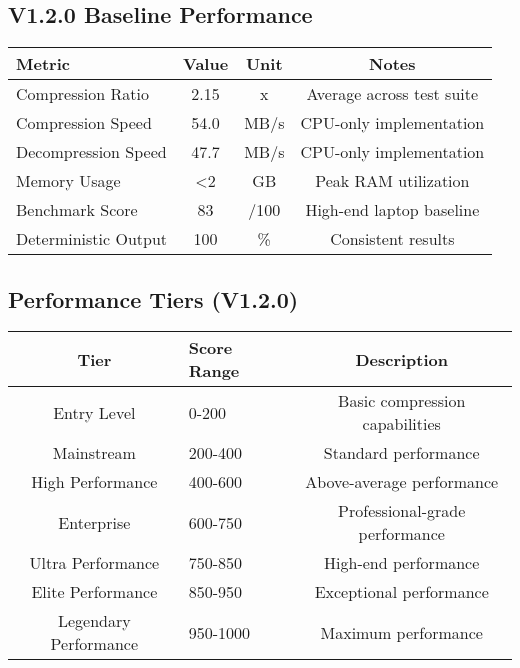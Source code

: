 \documentclass[12pt,a4paper]{article}
\begin{document}
\subsection{V1.2.0 Baseline Performance}
\begin{center}
\begin{tabular}{|l|c|c|c|}
\hline
\textbf{Metric} & \textbf{Value} & \textbf{Unit} & \textbf{Notes} \\
\hline
Compression Ratio & 2.15 & x & Average across test suite \\
Compression Speed & 54.0 & MB/s & CPU-only implementation \\
Decompression Speed & 47.7 & MB/s & CPU-only implementation \\
Memory Usage & <2 & GB & Peak RAM utilization \\
Benchmark Score & 83 & /100 & High-end laptop baseline \\
Deterministic Output & 100 & \% & Consistent results \\
\hline
\end{tabular}
\end{center}

\subsection{Performance Tiers (V1.2.0)}
\begin{center}
\begin{tabular}{|c|l|c|}
\hline
\textbf{Tier} & \textbf{Score Range} & \textbf{Description} \\
\hline
Entry Level & 0-200 & Basic compression capabilities \\
Mainstream & 200-400 & Standard performance \\
High Performance & 400-600 & Above-average performance \\
Enterprise & 600-750 & Professional-grade performance \\
Ultra Performance & 750-850 & High-end performance \\
Elite Performance & 850-950 & Exceptional performance \\
Legendary Performance & 950-1000 & Maximum performance \\
\hline
\end{tabular}
\end{center}
\end{document}
